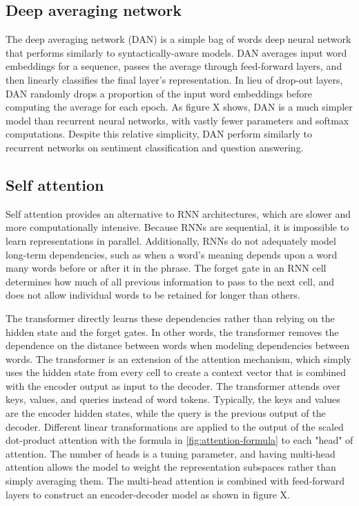 \subsection{Deep averaging network}

The deep averaging network (DAN) \cite{dan} is a simple bag of words deep neural network that performs similarly to syntactically-aware models. DAN averages input word embeddings for a sequence, passes the average through feed-forward layers, and then linearly classifies the final layer's representation. In lieu of drop-out layers, DAN randomly drops a proportion of the input word embeddings before computing the average for each epoch. As figure X shows, DAN is a much simpler model than recurrent neural networks, with vastly fewer parameters and softmax computations. Despite this relative simplicity, DAN perform similarly to recurrent networks on sentiment classification and question answering. 

\subsection{Self attention}

Self attention \cite{attention} provides an alternative to RNN architectures, which are slower and more computationally intensive. Because RNNs are sequential, it is impossible to learn representations in parallel. Additionally, RNNs do not adequately model long-term dependencies, such as when a word's meaning depends upon a word many words before or after it in the phrase. The forget gate in an RNN cell determines how much of all previous information to pass to the next cell, and does not allow individual words to be retained for longer than others. 

The transformer \cite{attention} directly learns these dependencies rather than relying on the hidden state and the forget gates. In other words, the transformer removes the dependence on the distance between words when modeling dependencies between words. The transformer is an extension of the attention mechanism, which simply uses the hidden state from every cell to create a context vector that is combined with the encoder output as input to the decoder. The transformer attends over keys, values, and queries instead of word tokens. Typically, the keys and values are the encoder hidden states, while the query is the previous output of the decoder. Different linear transformations are applied to the output of the scaled dot-product attention with the formula in \ref{fig:attention-formula} to each "head" of attention. The number of heads is a tuning parameter, and having multi-head attention allows the model to weight the representation subspaces rather than simply averaging them. The multi-head attention is combined with feed-forward layers to construct an encoder-decoder model as shown in figure X.

